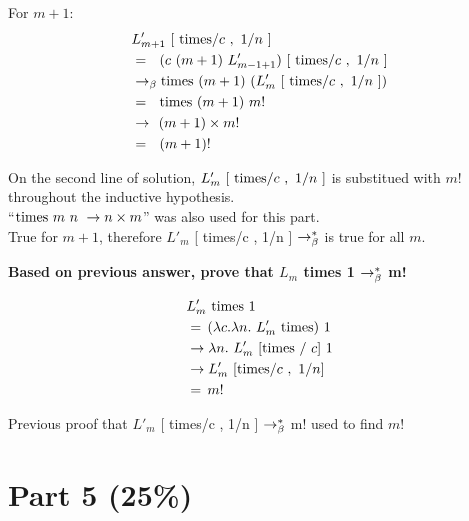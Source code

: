\documentclass{article}
\begin{document}
\begin{Large}
		For $m+1$:
		\begin{align*}
			&L_{m+1}^\prime \ [\ \tim / c \ , \ 1/n \ ] \\
			&= \saq (c \ (m+1) \ L_{m-1+1}^\prime ) \ [\ \tim / c \ , \ 1/n \ ] \\
			&\equals \tim \ (m+1) \ ( L_m^\prime \ [\ \tim / c \ , \ 1/n \ ]) \\
			&= \saq \tim \ (m+1) \ m! \\
			&\rightarrow \: \, (m+1) \times  m! \\
			&= \saq (m+1)!
		\end{align*}
		
		On the second line of solution, $L_m^\prime \ [\ \text{times} / c \ , \ 1/n \ ]$ is substitued with $m!$ throughout the inductive hypothesis. \\
		
		``$\text{times} \ m \ n \ \rightarrow n \times m$'' was also used for this part. \\
		
		True for $m+1$, therefore $L'_m$ [ times/c , 1/n ] $\rightarrow_\beta^*$ is true for all $m$. \\
		\newline
		
		\textbf{Based on previous answer, prove that $L_m$ times 1  $\rightarrow_\beta^*$ m!}
		
		\begin{align*}
			&L_m^\prime \ \text{times} \ 1 \\
			&= \, (\lambda c.\lambda n. \ L_m^\prime \ \text{times}) \ 1 \\
			&\rightarrow \lambda n. \ L_m^\prime \ [\text{times} \ / \ c] \ 1 \\
			&\rightarrow L_m^\prime \ [\text{times} /c \ , \ 1/n] \\
			&= \, m!
		\end{align*}
		
		Previous proof that $L'_m$ [ times/c , 1/n ] $\rightarrow_\beta^*$  m! used to find $m!$
	\end{Large}
	\newpage
	
	
	
	\section{Part 5 (25\%)}
	
\end{document}
